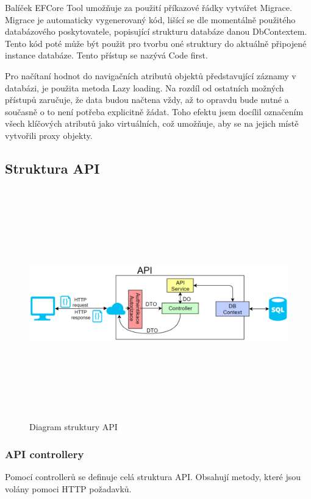\documentclass[
  glossaries,
]{kidiplom}
\begin{document}
Balíček EFCore Tool umožňuje za použití příkazové řádky vytvářet Migrace. Migrace je automaticky vygenerovaný kód, lišící se dle momentálně použitého databázového poskytovatele, popisující strukturu databáze danou DbContextem. Tento kód poté může být použit pro tvorbu oné struktury do aktuálně připojené instance databáze. Tento přístup se nazývá Code first.

Pro načítaní hodnot do navigačních atributů objektů představující záznamy v databázi, je použita metoda Lazy loading. Na rozdíl od ostatních možných přístupů zaručuje, že data budou načtena vždy, až to opravdu bude nutné a současně o to není potřeba explicitně žádat. Toho efektu jsem docílil označením všech klíčových atributů jako virtuálních, což umožňuje, aby se na jejich místě vytvořili proxy objekty.

\subsection{Struktura API}
\begin{figure}[H]
  	\centering
 	 \includegraphics[width=14cm,height=10cm,keepaspectratio]{API_Diagram}
 	 \caption{Diagram struktury API}
 	 \label{fig:ApiStructure}
\end{figure}

\subsubsection{API controllery}
Pomocí controllerů se definuje celá struktura API. Obsahují metody, které jsou volány pomoci HTTP požadavků. 
\end{document}
